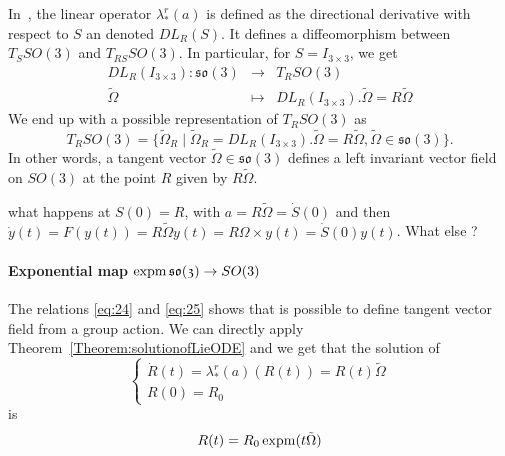In~\cite{Bruls.Cardona2010}, the linear operator $\lambda^r_{*}(a)$  is defined as  the directional derivative with respect to $S$ an denoted $DL_R(S)$. It defines a diffeomorphism between $T_SSO(3)$ and $T_{RS}SO(3)$. In particular, for $S=I_{3\times3}$, we get
\begin{equation}
  \label{eq:62}
  \begin{array}{rcl}
    DL_R(I_{3\times3}) : \mathfrak{so}(3) & \rightarrow & T_R SO(3) \\
    \tilde \Omega &\mapsto &DL_R(I_{3\times3}). \tilde \Omega = R \tilde \Omega
  \end{array}
\end{equation}
We end up with a possible representation of $T_{R} SO(3)$ as
\begin{equation}
  \label{eq:63}
  T_{R} SO(3) =\{\tilde \Omega_R \mid \tilde \Omega_R = DL_R(I_{3\times3}). \tilde \Omega = R \tilde \Omega, \tilde \Omega \in\mathfrak{so}(3)  \}.
\end{equation}
In other words, a tangent vector $\tilde \Omega \in \mathfrak{so}(3)$ defines a left invariant vector field on $SO(3)$ at the point $R$ given by $R \tilde \Omega$.




\begin{ndrva}
  what happens at $S(0)=R$, with $ a =R \tilde \Omega =\dot S(0)$ and then $\dot y(t) = F(y(t)) = R \tilde \Omega y(t) =  R\Omega \times y(t)= \dot S(0) y(t) $. What else ? 
\end{ndrva}


\paragraph{Exponential map $\operatorname{expm} \mathfrak{so(3)} \rightarrow SO(3)$}
The relations \eqref{eq:24} and \eqref{eq:25} shows that is possible to define tangent vector field from a group action. We can directly apply Theorem~\ref{Theorem:solutionofLieODE} and we get that the solution of
\begin{equation}
  \label{eq:130}
  \begin{cases}
  \dot R(t) = \lambda^r_{*}(a)(R(t)) = R(t)  \tilde \Omega \\
  R(0) = R_0
\end{cases}
\end{equation}
 is
\begin{equation}
  \label{eq:138}
  R(t) = R_0 \operatorname{expm}(t \tilde \Omega)
\end{equation}

